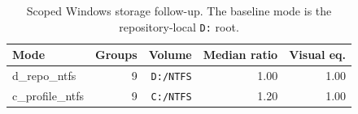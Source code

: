 \begin{table}[t]
\centering
\caption{Scoped Windows storage follow-up. The baseline mode is the repository-local \texttt{D:} root.}
\label{tab:b7-storage}
\begin{tabular}{lrrrr}
\toprule
Mode & Groups & Volume & Median ratio & Visual eq. \\
\midrule
d\_repo\_ntfs & 9 & \texttt{D:/NTFS} & 1.00 & 1.00 \\
c\_profile\_ntfs & 9 & \texttt{C:/NTFS} & 1.20 & 1.00 \\
\bottomrule
\end{tabular}
\end{table}
